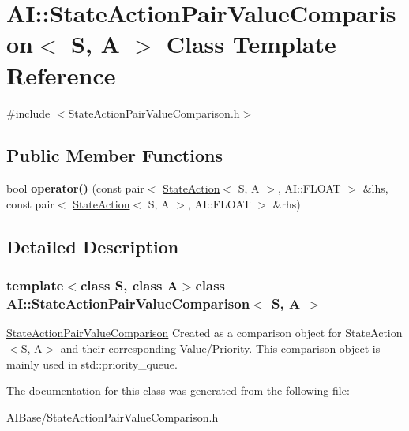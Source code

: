 \hypertarget{classAI_1_1StateActionPairValueComparison}{\section{A\-I\-:\-:State\-Action\-Pair\-Value\-Comparison$<$ S, A $>$ Class Template Reference}
\label{classAI_1_1StateActionPairValueComparison}
}


{\ttfamily \#include $<$State\-Action\-Pair\-Value\-Comparison.\-h$>$}

\subsection*{Public Member Functions}
\begin{DoxyCompactItemize}
\item 
\hypertarget{classAI_1_1StateActionPairValueComparison_aa21d4f2cb12071606b09296288094a8e}{bool {\bfseries operator()} (const pair$<$ \hyperlink{classAI_1_1StateAction}{State\-Action}$<$ S, A $>$, A\-I\-::\-F\-L\-O\-A\-T $>$ \&lhs, const pair$<$ \hyperlink{classAI_1_1StateAction}{State\-Action}$<$ S, A $>$, A\-I\-::\-F\-L\-O\-A\-T $>$ \&rhs)}\label{classAI_1_1StateActionPairValueComparison_aa21d4f2cb12071606b09296288094a8e}

\end{DoxyCompactItemize}


\subsection{Detailed Description}
\subsubsection*{template$<$class S, class A$>$class A\-I\-::\-State\-Action\-Pair\-Value\-Comparison$<$ S, A $>$}

\hyperlink{classAI_1_1StateActionPairValueComparison}{State\-Action\-Pair\-Value\-Comparison} Created as a comparison object for State\-Action$<$\-S, A$>$ and their corresponding Value/\-Priority. This comparison object is mainly used in std\-::priority\-\_\-queue. 

The documentation for this class was generated from the following file\-:\begin{DoxyCompactItemize}
\item 
A\-I\-Base/State\-Action\-Pair\-Value\-Comparison.\-h\end{DoxyCompactItemize}
